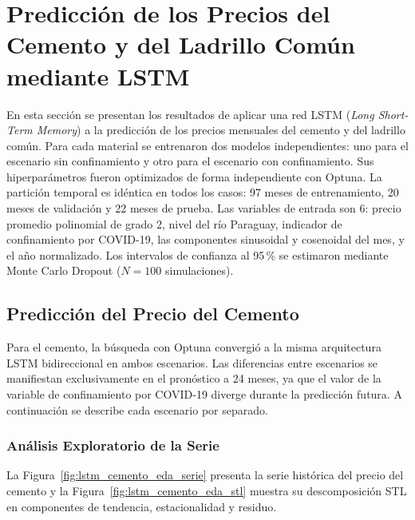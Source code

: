 
\section{Predicción de los Precios del Cemento y del Ladrillo Común mediante LSTM}

\vspace{0.3cm}
\justify
En esta sección se presentan los resultados de aplicar una red LSTM (\textit{Long Short-Term Memory}) a la predicción de los precios mensuales del cemento y del ladrillo común. Para cada material se entrenaron dos modelos independientes: uno para el escenario sin confinamiento y otro para el escenario con confinamiento. Sus hiperparámetros fueron optimizados de forma independiente con Optuna. La partición temporal es idéntica en todos los casos: 97 meses de entrenamiento, 20 meses de validación y 22 meses de prueba. Las variables de entrada son 6: precio promedio polinomial de grado 2, nivel del río Paraguay, indicador de confinamiento por COVID-19, las componentes sinusoidal y cosenoidal del mes, y el año normalizado. Los intervalos de confianza al 95\,\% se estimaron mediante Monte Carlo Dropout ($N=100$ simulaciones).

\subsection{Predicción del Precio del Cemento}

\justify
Para el cemento, la búsqueda con Optuna convergió a la misma arquitectura LSTM bidireccional en ambos escenarios. Las diferencias entre escenarios se manifiestan exclusivamente en el pronóstico a 24 meses, ya que el valor de la variable de confinamiento por COVID-19 diverge durante la predicción futura. A continuación se describe cada escenario por separado.

\subsubsection{Análisis Exploratorio de la Serie}

\justify
La Figura~\ref{fig:lstm_cemento_eda_serie} presenta la serie histórica del precio del cemento y la Figura~\ref{fig:lstm_cemento_eda_stl} muestra su descomposición STL en componentes de tendencia, estacionalidad y residuo.

